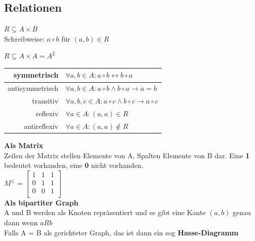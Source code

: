 \documentclass[a4paper]{article}
\begin{document}
\subsection{Relationen}
	\begin{multicols}{2}
	
	\begin{fdef}
	    $R \subseteq A \times B$ \\
	    Schreibweise: $a \circ b$ für $(a, b) \in R$
	\end{fdef}
	\begin{fdef}
	    $R \subseteq A \times A = A^2$
	\end{fdef}
	
	\begin{feig}
		\renewcommand{\arraystretch}{1.3}
		\begin{tabular}{r|l}
			symmetrisch     &   $\forall a,b \in A: a \circ b \leftrightarrow b \circ a$\\\hline
			antisymmetrisch &   $\forall a,b \in A: a \circ b \wedge b \circ a \rightarrow a = b$\\\hline
			transitiv       &   $\forall a,b,c \in A: a \circ c \wedge b \circ c \rightarrow a \circ c$ \\\hline
			reflexiv        &   $\forall a \in A: (a,a) \in R$\\\hline
			antireflexiv    &   $\forall a \in A: (a,a) \notin R$
		\end{tabular}
	\end{feig}
	
	\begin{fmerke}
	    \textbf{Als Matrix}\\
	        Zeilen der Matrix stellen Elemente von A, Spalten Elemente von B dar. Eine \textbf{1} bedeutet vorhanden, eine \textbf{0} nicht vorhanden.\\[1mm]
	        $M^{\leq} = \left[ \begin{array}{cccc}
	                                1 & 1 & 1\\
	                                0 & 1 & 1\\
	                                0 & 0 & 1\\
	                            \end{array} \right]$\\[1mm]
	
	    \textbf{Als bipartiter Graph}\\
	        A und B werden als Knoten repräsentiert und es gibt eine Kante $(a, b)$ genau dann wenn $a R b$\\[2mm]
	        Falls A = B als gerichteter Graph, das ist dann ein sog \textbf{Hasse-Diagramm}
	\end{fmerke}

	\end{multicols}
\end{document}
